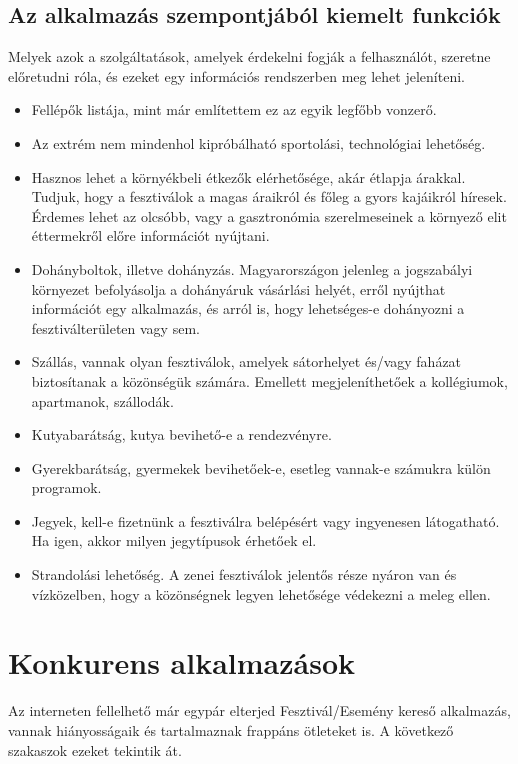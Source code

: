 \subsection{Az alkalmazás szempontjából kiemelt funkciók}

Melyek azok a szolgáltatások, amelyek érdekelni fogják a felhasználót, szeretne előretudni róla, és ezeket egy információs rendszerben meg lehet jeleníteni.
\begin{itemize}
\item Fellépők listája, mint már említettem ez az egyik legfőbb vonzerő.
\item Az extrém nem mindenhol kipróbálható sportolási, technológiai lehetőség.
\item Hasznos lehet a környékbeli étkezők elérhetősége, akár étlapja árakkal. Tudjuk, hogy a fesztiválok a magas áraikról és főleg a gyors kajáikról híresek. Érdemes lehet az olcsóbb, vagy a gasztronómia szerelmeseinek a környező elit éttermekről előre információt nyújtani.
\item Dohányboltok, illetve dohányzás. Magyarországon jelenleg a jogszabályi környezet befolyásolja a dohányáruk vásárlási helyét, erről nyújthat információt egy alkalmazás, és arról is, hogy lehetséges-e dohányozni a fesztiválterületen vagy sem.
\item Szállás, vannak olyan fesztiválok, amelyek sátorhelyet és/vagy faházat biztosítanak a közönségük számára. Emellett megjeleníthetőek a kollégiumok, apartmanok, szállodák.
\item Kutyabarátság, kutya bevihető-e a rendezvényre.
\item Gyerekbarátság, gyermekek bevihetőek-e, esetleg vannak-e számukra külön programok.
\item Jegyek, kell-e fizetnünk a fesztiválra belépésért vagy ingyenesen látogatható. Ha igen, akkor milyen jegytípusok érhetőek el.
\item Strandolási lehetőség. A zenei fesztiválok jelentős része nyáron van és vízközelben, hogy a közönségnek legyen lehetősége védekezni a meleg ellen.
\end{itemize}

\section{Konkurens alkalmazások}

Az interneten fellelhető már egypár elterjed Fesztivál/Esemény kereső alkalmazás, vannak hiányosságaik és tartalmaznak frappáns ötleteket is. A következő szakaszok ezeket tekintik át.

